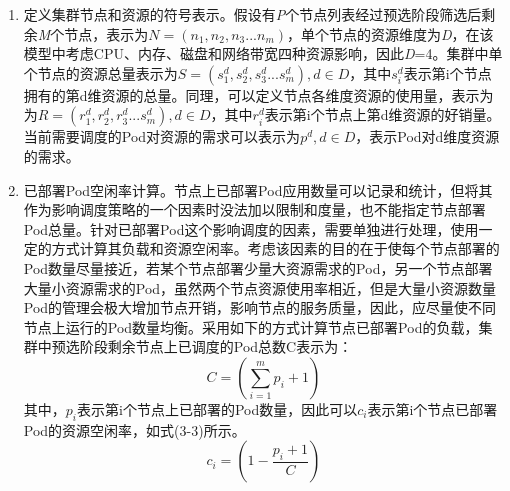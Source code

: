 \begin{enumerate}[(1)]
	\item 定义集群节点和资源的符号表示。假设有\emph{P}个节点列表经过预选阶段筛选后剩余\emph{M}个节点，表示为\begin{math}N=(n_{1}, n_{2}, n_{3}...n_{m})\end{math}，单个节点的资源维度为\emph{D}，在该模型中考虑CPU、内存、磁盘和网络带宽四种资源影响，因此\emph{D}=4。集群中单个节点的资源总量表示为\begin{math}S=(s^{d}_{1}, s^{d}_{2}, s^{d}_{3}...s^{d}_{m}), d\in{D}\end{math}，其中\begin{math}s^{d}_{i}\end{math}表示第i个节点拥有的第d维资源的总量。同理，可以定义节点各维度资源的使用量，表示为
	为\begin{math}R=(r^{d}_{1}, r^{d}_{2}, r^{d}_{3}...s^{d}_{m}), d\in{D}\end{math}，其中\begin{math}r^{d}_{i}\end{math}表示第i个节点上第d维资源的好销量。当前需要调度的Pod对资源的需求可以表示为\begin{math}p^{d}, d\in{D}\end{math}，表示Pod对d维度资源的需求。
	\item 已部署Pod空闲率计算。节点上已部署Pod应用数量可以记录和统计，但将其作为影响调度策略的一个因素时没法加以限制和度量，也不能指定节点部署Pod总量。针对已部署Pod这个影响调度的因素，需要单独进行处理，使用一定的方式计算其负载和资源空闲率。考虑该因素的目的在于使每个节点部署的Pod数量尽量接近，若某个节点部署少量大资源需求的Pod，另一个节点部署大量小资源需求的Pod，虽然两个节点资源使用率相近，但是大量小资源数量Pod的管理会极大增加节点开销，影响节点的服务质量，因此，应尽量使不同节点上运行的Pod数量均衡。采用如下的方式计算节点已部署Pod的负载，集群中预选阶段剩余节点上已调度的Pod总数C表示为：
	\begin{equation}
	C = (\sum_{i=1}^{m}p_{i} + 1)
	\end{equation}
	其中，\begin{math}p_{i}\end{math}表示第i个节点上已部署的Pod数量，因此可以\begin{math}c_{i}\end{math}表示第i个节点已部署Pod的资源空闲率，如式(3-3)所示。
	\begin{equation}
	c_{i} = (1-\frac{p_{i}+1}{C})
	\end{equation}

\end{enumerate}
